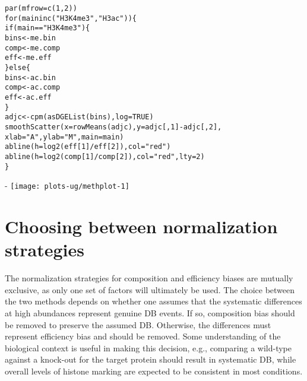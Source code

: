 \documentclass{report}\usepackage[]{graphicx}\usepackage[usenames,dvipsnames]{color}
\makeatletter
\def\maxwidth{ %
  \ifdim\Gin@nat@width>\linewidth
    \linewidth
  \else
    \Gin@nat@width
  \fi
}
\newcommand{\hlnum}[1]{\textcolor[rgb]{0.816,0.125,0.439}{#1}}%
\newcommand{\hlstr}[1]{\textcolor[rgb]{0.251,0.627,0.251}{#1}}%
\newcommand{\hlopt}[1]{\textcolor[rgb]{0,0,0}{#1}}%
\newcommand{\hlstd}[1]{\textcolor[rgb]{0.251,0.251,0.251}{#1}}%
\newcommand{\hlkwa}[1]{\textcolor[rgb]{0.125,0.125,0.941}{#1}}%
\newcommand{\hlkwb}[1]{\textcolor[rgb]{0,0,0}{#1}}%
\newcommand{\hlkwc}[1]{\textcolor[rgb]{0.251,0.251,0.251}{#1}}%
\newcommand{\hlkwd}[1]{\textcolor[rgb]{0.878,0.439,0.125}{#1}}%
\newenvironment{knitrout}{}{} %
\makeatother
\begin{document}
\begin{knitrout}
\color{fgcolor}\begin{kframe}
\begin{alltt}
\hlkwd{par}\hlstd{(}\hlkwc{mfrow}\hlstd{=}\hlkwd{c}\hlstd{(}\hlnum{1}\hlstd{,}\hlnum{2}\hlstd{))}
\hlkwa{for} \hlstd{(main} \hlkwa{in} \hlkwd{c}\hlstd{(}\hlstr{"H3K4me3"}\hlstd{,} \hlstr{"H3ac"}\hlstd{)) \{}
    \hlkwa{if} \hlstd{(main}\hlopt{==}\hlstr{"H3K4me3"}\hlstd{) \{}
        \hlstd{bins} \hlkwb{<-} \hlstd{me.bin}
        \hlstd{comp} \hlkwb{<-} \hlstd{me.comp}
        \hlstd{eff} \hlkwb{<-} \hlstd{me.eff}
    \hlstd{\}} \hlkwa{else} \hlstd{\{}
        \hlstd{bins} \hlkwb{<-} \hlstd{ac.bin}
        \hlstd{comp} \hlkwb{<-} \hlstd{ac.comp}
        \hlstd{eff} \hlkwb{<-} \hlstd{ac.eff}
    \hlstd{\}}
    \hlstd{adjc} \hlkwb{<-} \hlkwd{cpm}\hlstd{(}\hlkwd{asDGEList}\hlstd{(bins),} \hlkwc{log}\hlstd{=}\hlnum{TRUE}\hlstd{)}
    \hlkwd{smoothScatter}\hlstd{(}\hlkwc{x}\hlstd{=}\hlkwd{rowMeans}\hlstd{(adjc),} \hlkwc{y}\hlstd{=adjc[,}\hlnum{1}\hlstd{]}\hlopt{-}\hlstd{adjc[,}\hlnum{2}\hlstd{],}
                  \hlkwc{xlab}\hlstd{=}\hlstr{"A"}\hlstd{,} \hlkwc{ylab}\hlstd{=}\hlstr{"M"}\hlstd{,} \hlkwc{main}\hlstd{=main)}
    \hlkwd{abline}\hlstd{(}\hlkwc{h}\hlstd{=}\hlkwd{log2}\hlstd{(eff[}\hlnum{1}\hlstd{]}\hlopt{/}\hlstd{eff[}\hlnum{2}\hlstd{]),} \hlkwc{col}\hlstd{=}\hlstr{"red"}\hlstd{)}
    \hlkwd{abline}\hlstd{(}\hlkwc{h}\hlstd{=}\hlkwd{log2}\hlstd{(comp[}\hlnum{1}\hlstd{]}\hlopt{/}\hlstd{comp[}\hlnum{2}\hlstd{]),} \hlkwc{col}\hlstd{=}\hlstr{"red"}\hlstd{,} \hlkwc{lty}\hlstd{=}\hlnum{2}\hlstd{)}
\hlstd{\}}
\end{alltt}
\end{kframe}\begin{adjustwidth}{0mm}{-\fltoffset}
\texttt{[image: plots-ug/methplot-1]} \end{adjustwidth}
\end{knitrout}

\section{Choosing between normalization strategies}
\label{sec:normchoice}
The normalization strategies for composition and efficiency biases are mutually exclusive, as only one set of factors will ultimately be used.
The choice between the two methods depends on whether one assumes that the systematic differences at high abundances represent genuine DB events.
If so, composition bias should be removed to preserve the assumed DB.
Otherwise, the differences must represent efficiency bias and should be removed.
Some understanding of the biological context is useful in making this decision, e.g., comparing a wild-type against a knock-out for the target protein should result in systematic DB, while overall levels of histone marking are expected to be consistent in most conditions.
\end{document}
